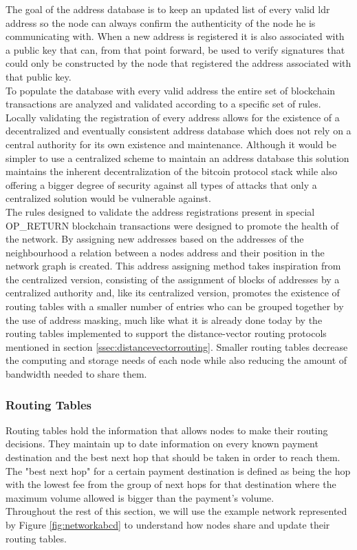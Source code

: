 The goal of the address database is to keep an updated list of every valid \acrshort{ldr} address so the node can always confirm the authenticity of the node he is communicating with. When a new address is registered it is also associated with a public key that can, from that point forward, be used to verify signatures that could only be constructed by the node that registered the address associated with that public key.\\
To populate the database with every valid address the entire set of blockchain transactions are analyzed and validated according to a specific set of rules. Locally validating the registration of every address allows for the existence of a decentralized and eventually consistent address database which does not rely on a central authority for its own existence and maintenance. Although it would be simpler to use a centralized scheme to maintain an address database this solution maintains the inherent decentralization of the bitcoin protocol stack while also offering a bigger degree of security against all types of attacks that only a centralized solution would be vulnerable against. \\
The rules designed to validate the address registrations present in special OP\_RETURN blockchain transactions were designed to promote the health of the network. By assigning new addresses based on the addresses of the neighbourhood a relation between a nodes address and their position in the network graph is created. This address assigning method takes inspiration from the centralized version, consisting of the assignment of blocks of addresses by a centralized authority and, like its centralized version, promotes the existence of routing tables with a smaller number of entries who can be grouped together by the use of address masking, much like what it is already done today by the routing tables implemented to support the distance-vector routing protocols mentioned in section \ref{ssec:distancevectorrouting}. Smaller routing tables decrease the computing and storage needs of each node while also reducing the amount of bandwidth needed to share them.

\subsubsection{Routing Tables}
\label{sssec:routing_tables}

Routing tables hold the information that allows nodes to make their routing decisions. They maintain up to date information on every known payment destination and the best next hop that should be taken in order to reach them. The "best next hop" for a certain payment destination is defined as being the hop with the lowest fee from the group of next hops for that destination where the maximum volume allowed is bigger than the payment's volume. \\
Throughout the rest of this section, we will use the example network represented by Figure \ref{fig:networkabcd} to understand how nodes share and update their routing tables.\\

